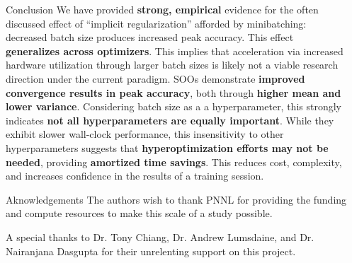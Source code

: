\documentclass[final]{beamer}
\newlength{\sepwidth}
\newlength{\colwidth}
\newcommand{\separatorcolumn}{\begin{column}{\sepwidth}\end{column}}
\begin{document}
\begin{frame}[t]
\begin{columns}[t]
\begin{column}{\colwidth}
      \begin{block}{Conclusion}
        We have provided \textbf{strong, empirical} evidence for the often
        discussed effect of ``implicit regularization'' afforded by
        minibatching: decreased batch size produces increased peak accuracy.
        This effect \textbf{generalizes across optimizers}. This implies that
        acceleration via increased hardware utilization through larger batch
        sizes is likely not a viable research direction under the current
        paradigm. SOOs demonstrate \textbf{improved convergence results in peak
          accuracy}, both through \textbf{higher mean and lower variance}.
        Considering batch size as a a hyperparameter, this strongly indicates
        \textbf{not all hyperparameters are equally important}.  While they
        exhibit slower wall-clock performance, this insensitivity to other
        hyperparameters suggests that \textbf{hyperoptimization efforts may not
          be needed}, providing \textbf{amortized time savings}. This reduces cost,
        complexity, and increases confidence in the results of a training
        session.
      \end{block}

      \begin{block}{Aknowledgements}
        The authors wish to thank PNNL for providing the funding and compute resources to make this scale
        of a study possible.

        A special thanks to Dr. Tony Chiang, Dr. Andrew Lumsdaine, and Dr. Nairanjana Dasgupta for
        their unrelenting support on this project.
      \end{block}

    \end{column}

    \separatorcolumn
  \end{columns}
\end{frame}
\end{document}
